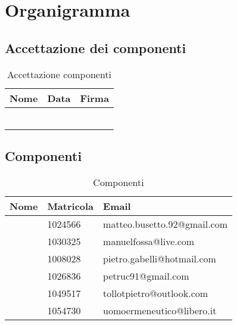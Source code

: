 \section{Organigramma}{


	\subsection{Accettazione dei componenti}{
		\begin{table}[H]
			\centering
		  \begin{tabular}{p{5cm}p{3cm}p{7cm}}
			   \toprule Nome & Data & Firma \\
			   \midrule
			   \BM & &  \\
			   \FM &  &  \\
			   \GP  & &  \\
			   \PM &  &  \\
			   \TP &  &  \\
			   \VG &  &  \\
			   \bottomrule
		 \end{tabular}
		 	\label{tab:AccettazioneComponenti}
		 	\caption{Accettazione componenti}
		\end{table}
	}
	\subsection{Componenti}{
		\begin{table}[H]
			\centering
		  \begin{tabular}{p{5cm}p{3cm}p{7cm}}
			   \toprule Nome & Matricola & Email \\
			   \midrule
			   \BM & 1024566 & matteo.busetto.92@gmail.com \\
			   \FM & 1030325  &  manuelfossa@live.com\\
			   \GP & 1008028 & pietro.gabelli@hotmail.com \\
			   \PM & 1026836 & petruc91@gmail.com \\
			   \TP & 1049517 &  tollotpietro@outlook.com\\
			   \VG & 1054730 &  uomoermeneutico@libero.it\\
			   \bottomrule
		 \end{tabular}
		 	\label{tab:Componenti}
		 	\caption{Componenti}
		\end{table}
		}
}